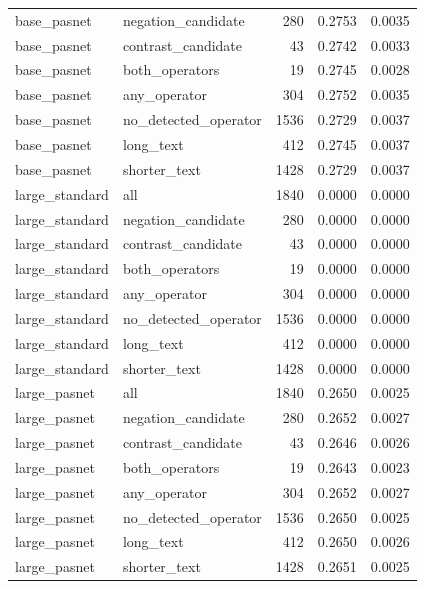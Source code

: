 \begin{tabular}{llrrr}
base\_pasnet & negation\_candidate & 280 & 0.2753 & 0.0035 \\
base\_pasnet & contrast\_candidate & 43 & 0.2742 & 0.0033 \\
base\_pasnet & both\_operators & 19 & 0.2745 & 0.0028 \\
base\_pasnet & any\_operator & 304 & 0.2752 & 0.0035 \\
base\_pasnet & no\_detected\_operator & 1536 & 0.2729 & 0.0037 \\
base\_pasnet & long\_text & 412 & 0.2745 & 0.0037 \\
base\_pasnet & shorter\_text & 1428 & 0.2729 & 0.0037 \\
large\_standard & all & 1840 & 0.0000 & 0.0000 \\
large\_standard & negation\_candidate & 280 & 0.0000 & 0.0000 \\
large\_standard & contrast\_candidate & 43 & 0.0000 & 0.0000 \\
large\_standard & both\_operators & 19 & 0.0000 & 0.0000 \\
large\_standard & any\_operator & 304 & 0.0000 & 0.0000 \\
large\_standard & no\_detected\_operator & 1536 & 0.0000 & 0.0000 \\
large\_standard & long\_text & 412 & 0.0000 & 0.0000 \\
large\_standard & shorter\_text & 1428 & 0.0000 & 0.0000 \\
large\_pasnet & all & 1840 & 0.2650 & 0.0025 \\
large\_pasnet & negation\_candidate & 280 & 0.2652 & 0.0027 \\
large\_pasnet & contrast\_candidate & 43 & 0.2646 & 0.0026 \\
large\_pasnet & both\_operators & 19 & 0.2643 & 0.0023 \\
large\_pasnet & any\_operator & 304 & 0.2652 & 0.0027 \\
large\_pasnet & no\_detected\_operator & 1536 & 0.2650 & 0.0025 \\
large\_pasnet & long\_text & 412 & 0.2650 & 0.0026 \\
large\_pasnet & shorter\_text & 1428 & 0.2651 & 0.0025 \\
\bottomrule
\end{tabular}
